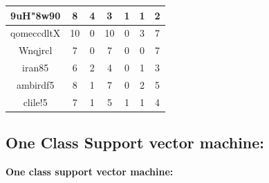 \documentclass[runningheads]{llncs}
\begin{document}
{\begin{table}[htb]
{\begin{tabular}{||c||c||c||c||c||c||c||}
 9uH"8w90 &8 & 4&3&1&1&2\\
 \hline
 qomeccdltX & 10 & 0&10&0&3&7\\
 \hline
 Wnqjrcl & 7 & 0&7&0&0&7\\
 \hline
 iran85 & 6 & 2&4&0&1&3\\
\hline
ambirdf5 & 8 & 1&7&0&2&5\\
\hline
clile!5 & 7 & 1&5&1&1&4\\

	\hline
	\hline
\end{tabular}
}
\end{table}
}

\newline
\hfill \break
\newline
\subsection{One Class Support vector machine:}
\textbf{One class support vector machine:}
\end{document}
